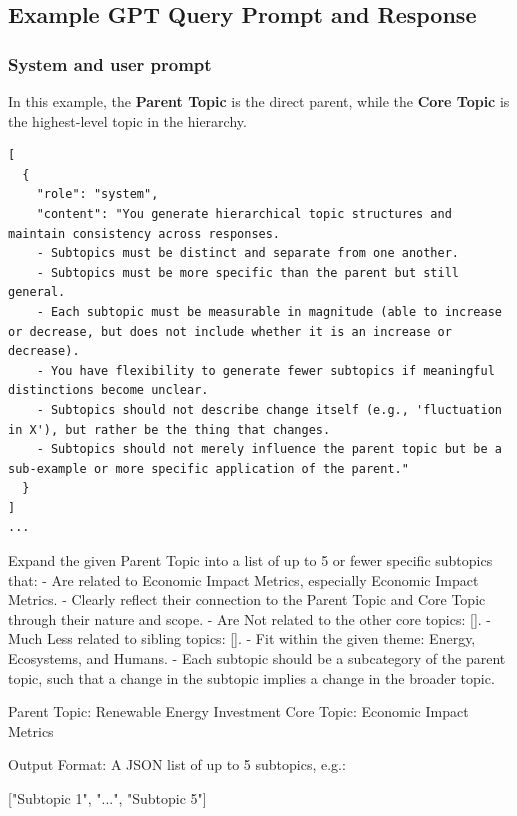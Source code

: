 \subsection{Example GPT Query Prompt and Response}
\subsubsection*{System and user prompt}
In this example, the \textbf{Parent Topic} is the direct parent, while the \textbf{Core Topic} is the highest-level topic in the hierarchy.

\begin{lstlisting}[style=json]
[
  {
    "role": "system",
    "content": "You generate hierarchical topic structures and maintain consistency across responses.
    - Subtopics must be distinct and separate from one another.
    - Subtopics must be more specific than the parent but still general.
    - Each subtopic must be measurable in magnitude (able to increase or decrease, but does not include whether it is an increase or decrease).
    - You have flexibility to generate fewer subtopics if meaningful distinctions become unclear.
    - Subtopics should not describe change itself (e.g., 'fluctuation in X'), but rather be the thing that changes.
    - Subtopics should not merely influence the parent topic but be a sub-example or more specific application of the parent."
  }
]
...
\end{lstlisting}

Expand the given Parent Topic into a list of up to 5 or fewer specific subtopics that:
- Are related to Economic Impact Metrics, especially Economic Impact Metrics.
- Clearly reflect their connection to the Parent Topic and Core Topic through their nature and scope.
- Are Not related to the other core topics: [].
- Much Less related to sibling topics: [].
- Fit within the given theme: Energy, Ecosystems, and Humans.
- Each subtopic should be a subcategory of the parent topic, such that a change in the subtopic implies a change in the broader topic.

Parent Topic: Renewable Energy Investment 
Core Topic: Economic Impact Metrics

Output Format: A JSON list of up to 5 subtopics, e.g.:

["Subtopic 1", "...", "Subtopic 5"]



